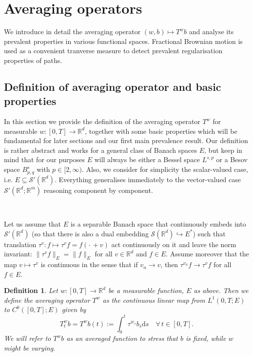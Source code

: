 \documentclass[10pt]{article}
\newcommand{\assign}{:=}
\newcommand{\mathd}{\mathrm{d}}
\newtheorem{definition}{Definition}
\begin{document}
\section{Averaging operators}\label{sec3}

We introduce in detail the averaging operator $(w, b) \mapsto T^w b$ and
analyse its prevalent properties in various functional spaces. Fractional
Brownian motion is used as a convenient tranverse measure to detect prevalent
regularisation properties of paths.

\subsection{Definition of averaging operator and basic
properties}\label{sec3.1}

In this section we provide the definition of the averaging operator $T^w$ for
measurable $w : [0, T] \rightarrow \mathbb{R}^d$, together with some basic
properties which will be fundamental for later sections and our first main
prevalence result. Our definition is rather abstract and works for a general
class of Banach spaces $E$, but keep in mind that for our purposes $E$ will
always be either a Bessel space $L^{s, p}$ or a Besov space $B^s_{p, q}$ with
$p \in [2, \infty)$. Also, we consider for simplicity the scalar-valued case,
i.e. $E \subseteq \mathcal{S}' (\mathbb{R}^d)$. Everything generalises
immediately to the vector-valued case $\mathcal{S}' (\mathbb{R}^d ;
\mathbb{R}^m)$ reasoning component by component.

\

Let us assume that $E$ is a separable Banach space that continuously embeds
into $\mathcal{S}' (\mathbb{R}^d)$ (so that there is also a dual embedding
$\mathcal{S} (\mathbb{R}^d) \hookrightarrow E^{\ast}$) such that translation
$\tau^v : f \mapsto \tau^v f = f \left( \cdot \, + v \right)$ act continuously
on it and leave the norm invariant: $\| \tau^v f \|_E = \| f \|_E$ for all $v
\in \mathbb{R}^d$ and $f \in E$. Assume moreover that the map $v \mapsto
\tau^v$ is continuous in the sense that if $v_n \rightarrow v$, then
$\tau^{v_n} f \rightarrow \tau^v f$ for all $f \in E$.

\begin{definition}
  \label{sec3.1 definition averaging}Let $w : [0, T] \rightarrow \mathbb{R}^d$
  be a measurable function, $E$ as above. Then we define the averaging
  operator $T^w$ as the continuous linear map from $L^1 (0, T ; E)$ to $C^0
  ([0, T] ; E)$ given by
  \[ T^w_t b = T^w b (t) \assign \int_0^t \tau^{w_s} b_s \mathd s \quad
     \forall \, t \in [0, T] . \]
  We will refer to $T^w b$ as an averaged function to stress that $b$ is
  fixed, while $w$ might be varying.
\end{definition}
\end{document}
